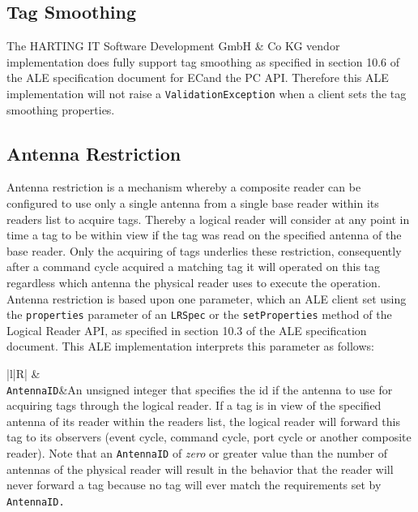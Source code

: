 \documentclass[11pt,a4paper,oneside]{article}
\newif\ifincludecc
\begin{document}
\subsection{Tag Smoothing}
\label{subsec:TagSmoothing}
The HARTING IT Software Development GmbH \& Co KG vendor implementation does fully support tag smoothing as specified in section 10.6 of the ALE specification document for EC\ifincludecc , CC \fi and the PC API. Therefore this ALE implementation will not raise a \texttt{ValidationException} when a client sets the tag smoothing properties.

\subsection{Antenna Restriction}
\label{subsec:Antenna}
Antenna restriction is a mechanism whereby a composite reader can be configured to use only a single antenna from a single base reader within its readers list to acquire tags. Thereby a logical reader will consider at any point in time a tag to be within view if the tag was read on the specified antenna of the base reader. Only the acquiring of tags underlies these restriction, consequently after a command cycle acquired a matching tag it will operated on this tag regardless which antenna the physical reader uses to execute the operation. Antenna restriction is based upon one parameter, which an ALE client set using the \texttt{properties} parameter of an \texttt{LRSpec} or the \texttt{setProperties} method of the Logical Reader API, as specified in section 10.3 of the ALE specification document. This ALE implementation interprets this parameter as follows:

\begin{table}[!h]
\begin{tabularx}{\textwidth}{|l|R|}
\hline
{}&
\\
\hline
\texttt{AntennaID}&An unsigned integer that specifies the id if the antenna to use for acquiring tags through the logical reader. If a tag is in view of the specified antenna of its reader within the readers list, the logical reader will forward this tag to its observers (event cycle, command cycle, port cycle or another composite reader). Note that an \texttt{AntennaID} of \emph{zero} or greater value than the number of antennas of the physical reader will result in the behavior that the reader will never forward a tag because no tag will ever match the requirements set by \texttt{AntennaID.}\\
\hline
\end {tabularx}
\caption{Antenna Restriction Properties}
\MakeLineNo
\end{table}
\FloatBarrier
\end{document}
